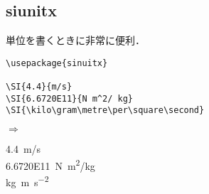 \documentclass{jsarticle}
\begin{document}
\subsection{siunitx}
単位を書くときに非常に便利．

\begin{minipage}[c]{.50\textwidth}
\begin{screen}
\small
\begin{verbatim}
\usepackage{sinuitx}

\SI{4.4}{m/s}
\SI{6.6720E11}{N m^2/ kg}
\SI{\kilo\gram\metre\per\square\second}
\end{verbatim}
\end{screen}
\end{minipage}%
$\Rightarrow$
\begin{minipage}{.45\textwidth}
\begin{shadebox}
\SI{4.4}{m/s} \\
\SI{6.6720E11}{N m^2/ kg} \\
\si{\kilo\gram\metre\per\square\second}
\end{shadebox}
\end{minipage}
\end{document}
